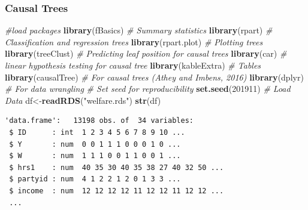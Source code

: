\documentclass[
  shownotes,
  xcolor={svgnames},
  hyperref={colorlinks,citecolor=DarkBlue,linkcolor=DarkRed,urlcolor=DarkBlue}
  , aspectratio=169]{beamer}
\newenvironment{Shaded}{\begin{snugshade}}{\end{snugshade}}
\newcommand{\CommentTok}[1]{\textcolor[rgb]{0.56,0.35,0.01}{\textit{#1}}}
\newcommand{\DecValTok}[1]{\textcolor[rgb]{0.00,0.00,0.81}{#1}}
\newcommand{\KeywordTok}[1]{\textcolor[rgb]{0.13,0.29,0.53}{\textbf{#1}}}
\newcommand{\NormalTok}[1]{#1}
\newcommand{\StringTok}[1]{\textcolor[rgb]{0.31,0.60,0.02}{#1}}
\begin{document}
\begin{frame}[fragile]
\frametitle{Causal Trees}

\begin{scriptsize}
\begin{Shaded}
\begin{Highlighting}[]
\CommentTok{\#load packages}
\KeywordTok{library}\NormalTok{(fBasics)     }\CommentTok{\# Summary statistics }
\KeywordTok{library}\NormalTok{(rpart)       }\CommentTok{\# Classification and regression trees}
\KeywordTok{library}\NormalTok{(rpart.plot)  }\CommentTok{\# Plotting trees}
\KeywordTok{library}\NormalTok{(treeClust)   }\CommentTok{\# Predicting leaf position for causal trees }
\KeywordTok{library}\NormalTok{(car)         }\CommentTok{\# linear hypothesis testing for causal tree}
\KeywordTok{library}\NormalTok{(kableExtra)  }\CommentTok{\# Tables}
\KeywordTok{library}\NormalTok{(causalTree) }\CommentTok{\# For causal trees (Athey and Imbens, 2016)  }
\KeywordTok{library}\NormalTok{(dplyr)} \CommentTok{\# For data wrangling }
\CommentTok{\# Set seed for reproducibility}
\KeywordTok{set.seed}\NormalTok{(}\DecValTok{201911}\NormalTok{) }
\CommentTok{\# Load Data}
\NormalTok{df\textless{}{-}}\KeywordTok{readRDS}\NormalTok{(}\StringTok{"welfare.rds"}\NormalTok{)}
\KeywordTok{str}\NormalTok{(df)}
\end{Highlighting}
\end{Shaded}
\end{scriptsize}
\begin{tiny}
\begin{verbatim}
'data.frame':   13198 obs. of  34 variables:
 $ ID      : int  1 2 3 4 5 6 7 8 9 10 ...
 $ Y       : num  0 0 1 1 1 0 0 0 1 0 ...
 $ W       : num  1 1 1 0 0 1 1 0 0 1 ...
 $ hrs1    : num  40 35 30 40 35 38 27 40 32 50 ...
 $ partyid : num  4 1 2 2 1 2 0 1 3 3 ...
 $ income  : num  12 12 12 12 11 12 12 11 12 12 ...
 ...
 
\end{verbatim}
\end{tiny}

\end{frame}
\end{document}
